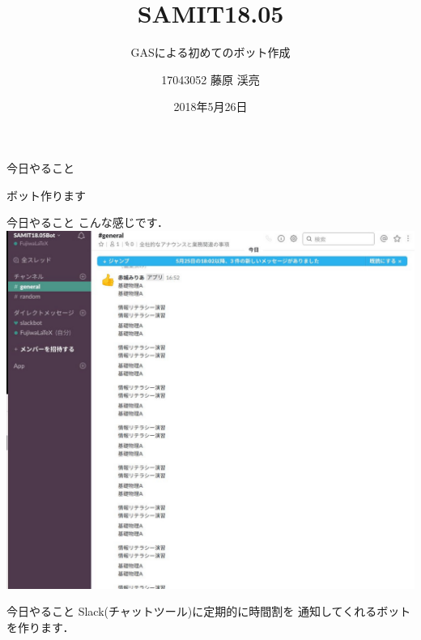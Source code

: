 \documentclass[dvipdfmx,xcolor={svgnames},aspectratio=169]{beamer}
\title{SAMIT18.05}
\subtitle{GASによる初めてのボット作成}
\author{17043052 藤原 渓亮}
\date{2018年5月26日}
\begin{document}
  \maketitle
  \begin{frame}{今日やること}
    \begin{center}
      \Huge ボット作ります
    \end{center}
  \end{frame}
  \begin{frame}{今日やること}
    \huge こんな感じです．
    \includegraphics[width=\hsize]{sc01.jpg}
  \end{frame}
  \begin{frame}{今日やること}
    \huge Slack(チャットツール)に定期的に時間割を
    通知してくれるボットを作ります．
  \end{frame}
\end{document}

